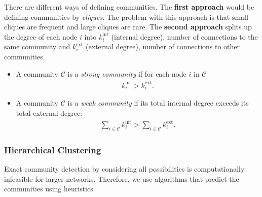 \documentclass[english]{panikzettel}
\begin{document}
There are different ways of defining communities.
The \textbf{first approach} would be defining communities by \textit{cliques}.
The problem with this approach is that small cliques are frequent and large cliques are rare.
The \textbf{second approach} splits up the degree of each node $ i $ into $ k_i^\text{int} $ (internal degree), number of connections to the same community and $ k_i^\text{ext} $ (external degree), number of connections to other communities.
\begin{itemize}
	\item A community $ \mathcal{C} $ is a \emph{strong community} if for each node $ i $ in $ \mathcal{C} $
	\begin{align*}
		k_i^\text{int} > k_i^\text{ext}.
	\end{align*}
	\item A community $ \mathcal{C} $ is a \emph{weak community} if its total internal degree exceeds its total external degree:
	\begin{align*}
		\sum\limits_{i \in \mathcal{C}} k_i^\text{int} > \sum\limits_{i \in \mathcal{C}} k_i^\text{ext}.
	\end{align*}
\end{itemize}

\subsubsection{Hierarchical Clustering}
Exact community detection by considering all possibilities is computationally infeasible for larger networks.
Therefore, we use algorithms that predict the communities using heuristics.
\end{document}
